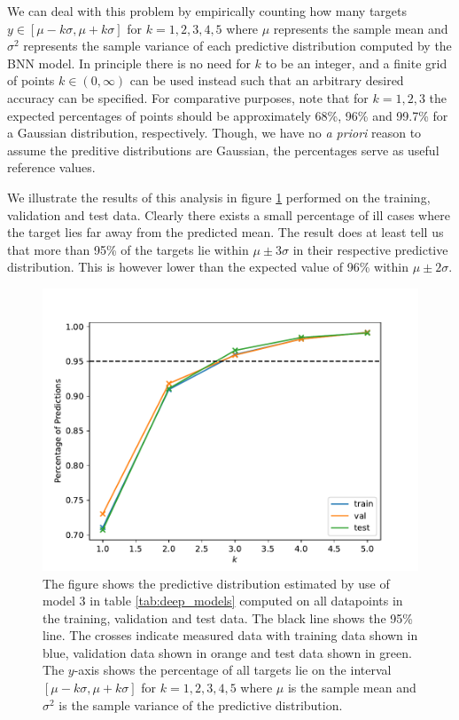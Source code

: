 We can deal with this problem by empirically counting how many targets $y \in [\mu - k\sigma, \mu + k \sigma]$ for $k = 1, 2, 3, 4, 5$ where $\mu$ represents the sample mean and $\sigma^2$ represents the sample variance of each predictive distribution computed by the BNN model. In principle there is no need for $k$ to be an integer, and a finite grid of points $k \in (0, \infty)$ can be used instead such that an arbitrary desired accuracy can be specified. 
For comparative purposes, note that for $k = 1, 2, 3$ the expected percentages of points should be approximately 68\%, 96\% and 99.7\% for a Gaussian distribution, respectively. Though, we have no \textit{a priori} reason to assume the preditive distributions are Gaussian, the percentages serve as useful reference values.

We illustrate the results of this analysis in figure \ref{fig:confidence} performed on the training, validation and test data. Clearly there exists a small percentage of ill cases where the target lies far away from the predicted mean. The result does at least tell us that more than 95\% of the targets lie within $\mu \pm 3\sigma$ in their respective predictive distribution. This is however lower than the expected value of 96\% within $\mu \pm 2\sigma$.
\begin{figure}[H]
    \centering
    \includegraphics[scale=0.7]{figures/confidence_estimation/good_vs_bad_cases_confidence.pdf}
    \caption{
        The figure shows the predictive distribution estimated by use of model 3 in table \ref{tab:deep_models}
        computed on all datapoints in the training, validation and test data. The black line shows the 95\% line. The crosses indicate measured data with training data shown in blue, validation data shown in orange and test data shown in green. The $y$-axis shows the percentage of all targets lie on the interval $[\mu - k\sigma, \mu + k\sigma]$ for $k=1,2,3,4,5$ where $\mu$ is the sample mean and $\sigma^2$ is the sample variance of the predictive distribution.
    }
    \label{fig:confidence}
\end{figure}






